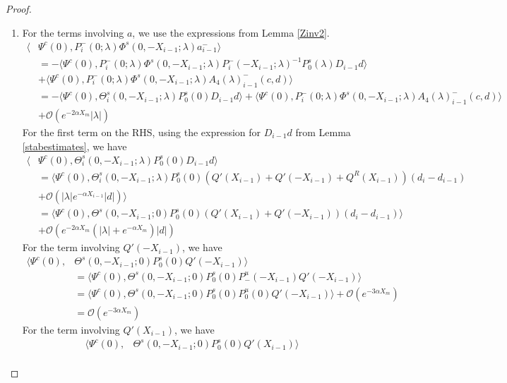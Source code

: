 \documentclass[thesis.tex]{subfiles}
\begin{document}
\begin{lemma}
\begin{proof}
\begin{enumerate}
\item For the terms involving $a$, we use the expressions from Lemma \ref{Zinv2}.
\begin{align*}
\langle &\Psi^c(0), P_i^-(0; \lambda) \Phi^s(0, -X_{i-1}; \lambda) a_{i-1}^- \rangle \\
&= -\langle \Psi^c(0), P_i^-(0; \lambda) \Phi^s(0, -X_{i-1}; \lambda) P_i^-(-X_{i-1}; \lambda)^{-1} P_0^s(\lambda) D_{i-1} d \rangle \\
&+ \langle \Psi^c(0), P_i^-(0; \lambda) \Phi^s(0, -X_{i-1}; \lambda) A_4(\lambda)_{i-1}^-(c, d) \rangle \\
&= -\langle \Psi^c(0), \Theta_i^s(0, -X_{i-1}; \lambda) P_0^s(0) D_{i-1} d \rangle + \langle \Psi^c(0), P_i^-(0; \lambda) \Phi^s(0, -X_{i-1}; \lambda) A_4(\lambda)_{i-1}^-(c, d) \rangle \\
&+ \mathcal{O}(e^{-2 \alpha X_m}|\lambda|)
\end{align*}
For the first term on the RHS, using the expression for $D_{i-1}d$ from Lemma \ref{stabestimates}, we have
\begin{align*}
\langle &\Psi^c(0), \Theta_i^s(0, -X_{i-1}; \lambda) P_0^s(0) D_{i-1} d \rangle \\
&= \langle \Psi^c(0), \Theta_i^s(0, -X_{i-1}; \lambda) P_0^s(0) ( Q'(X_{i-1}) + Q'(-X_{i-1}) + Q^R(X_{i-1}))(d_i - d_{i-1}) \\
&+ \mathcal{O} \left( |\lambda| e^{-\alpha X_{i-1}} |d| \right) \rangle \\
&= \langle \Psi^c(0), \Theta^s(0, -X_{i-1}; 0) P_0^s(0) ( Q'(X_{i-1}) + Q'(-X_{i-1}))(d_i - d_{i-1})\rangle \\
&+ \mathcal{O}( e^{-2 \alpha X_m} ( |\lambda| +  e^{-\alpha X_m} ) |d|)
\end{align*}
For the term involving $Q'(-X_{i-1})$, we have
\begin{align*}
\langle \Psi^c(0), &\Theta^s(0, -X_{i-1}; 0) P_0^s(0) Q'(-X_{i-1}) \rangle \\
&= \langle \Psi^c(0), \Theta^s(0, -X_{i-1}; 0) P_0^s(0) P^u_-(-X_{i-1}) Q'(-X_{i-1}) \rangle \\
&= \langle \Psi^c(0), \Theta^s(0, -X_{i-1}; 0) P_0^s(0) P_0^u(0) Q'(-X_{i-1}) \rangle + \mathcal{O}(e^{-3 \alpha X_m}) \\
&= \mathcal{O}(e^{-3 \alpha X_m})
\end{align*}
For the term involving $Q'(X_{i-1})$, we have
\begin{align*}
\langle \Psi^c(0), &\Theta^s(0, -X_{i-1}; 0) P_0^s(0) Q'(X_{i-1}) \rangle \\

\end{align*}
\end{enumerate}
\end{proof}
\end{lemma}
\end{document}
